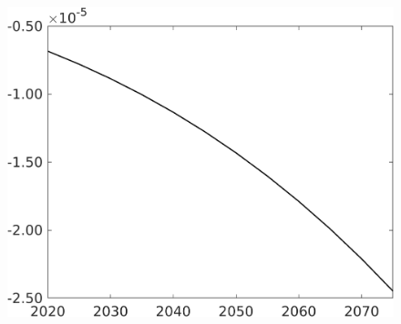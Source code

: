 \begin{figure}[h!!]
\begin{minipage}[]{0.32\textwidth}
	\end{minipage}
	\begin{minipage}[]{0.32\textwidth}
		\includegraphics[width=1\textwidth]{../../codding_model/own_basedOnFried/optimalPol_010922_revision/figures/all_13Sept22/CompTaufPER_bytaul_Reg0_snS_spillover0_nsk0_xgr0_knspil0_sep0_LFlimit0_emsbase0_countec0_GovRev0_etaa0.79_lgd0.png}
	\end{minipage}
	\begin{minipage}[]{0.32\textwidth}

\end{minipage}
\end{figure}
